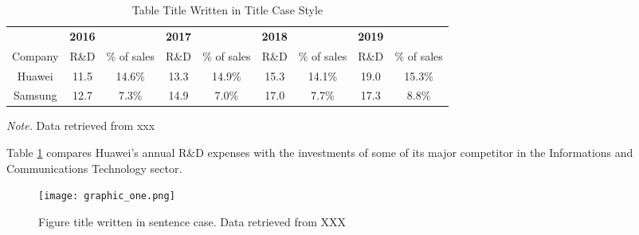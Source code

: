 \documentclass{book}
\begin{document}
\begin{table}

	\caption{Table Title Written in Title Case Style}
	
	\begin{tabular}{ccccccccc}
	
	\hline
	
		&	\textbf{2016}	&&	\textbf{2017}	&& \textbf{2018}	&& \textbf{2019}	& \\
				
	Company	&	R\&D	&	\% of sales	& R\&D	&	\% of sales	&	R\&D	&	\% of sales	&	R\&D	&	\% of sales	\\
	
	\hline
	
	Huawei	& 11.5	& 14.6\%	& 13.3		&	14.9\%		& 15.3		&	14.1\%		& 19.0		& 15.3\% \\
	Samsung	& 12.7	&	7.3\%	& 14.9		& 7.0\%			&	17.0	& 7.7\%	& 17.3	& 8.8\% \\
	
	\hline
	
	\end{tabular}
	
	\textit{Note.} Data retrieved from xxx

	\label{table:RnD_Comparison}
	
\end{table}

Table \ref{table:RnD_Comparison} compares Huawei's annual R\&D expenses with the investments of some of its major competitor in the Informations and Communications Technology sector.





\begin{figure}

	\centering
	
	\texttt{[image: graphic\_one.png]}
	
	
	\caption{Figure title written in sentence case. Data retrieved from XXX}
	
	\label{figure:data}
	
\end{figure}
\end{document}
